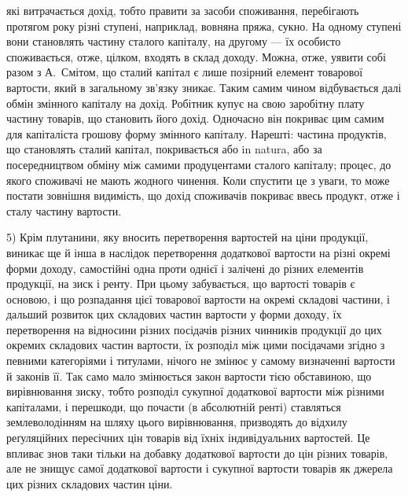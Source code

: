 \parcont{}  %
які витрачається дохід, тобто правити за засоби споживання, перебігають протягом
року різні ступені, наприклад, вовняна пряжа, сукно. На одному ступені
вони становлять частину сталого капіталу, на другому — їх особисто споживається,
отже, цілком, входять в склад доходу. Можна, отже, уявити собі разом
з А.~Смітом, що сталий капітал є лише позірний елемент товарової вартости,
який в загальному зв’язку зникає. Таким самим чином відбувається далі обмін
змінного капіталу на дохід. Робітник купує на свою заробітну плату частину
товарів, що становить його дохід. Одночасно він покриває цим самим для капіталіста
грошову форму змінного капіталу. Нарешті: частина продуктів, що становлять
сталий капітал, покривається або in natura, або за посередництвом обміну
між самими продуцентами сталого капіталу; процес, до якого споживачі
не мають жодного чинення. Коли спустити це з уваги, то може постати зовнішня
видимість, що дохід споживачів покриває ввесь продукт, отже і сталу частину
вартости.

5) Крім плутанини, яку вносить перетворення вартостей на ціни продукції,
виникає ще й інша в наслідок перетворення додаткової вартости на різні окремі
форми доходу, самостійні одна проти однієї і залічені до різних елементів продукції,
на зиск і ренту. При цьому забувається, що вартості товарів є основою, і що
розпадання цієї товарової вартости на окремі складові частини, і дальший розвиток
цих складових частин вартости у форми доходу, їх перетворення на відносини
різних посідачів різних чинників продукції до цих окремих складових
частин вартости, їх розподіл між цими посідачами згідно з певними категоріями
і титулами, нічого не змінює у самому визначенні вартости й законів її.
Так само мало змінюється закон вартости тією обставиною, що вирівнювання
зиску, тобто розподіл сукупної додаткової вартости між різними капіталами, і
перешкоди, що почасти (в абсолютній ренті) ставляться землеволодінням на
шляху цього вирівнювання, призводять до відхилу реґуляційних пересічних цін
товарів від їхніх індивідуальних вартостей. Це впливає знов таки тільки на
добавку додаткової вартости до цін різних товарів, але не знищує самої додаткової
вартости і сукупної вартости товарів як джерела цих різних складових
частин ціни.

